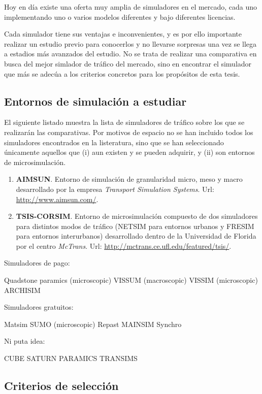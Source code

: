 Hoy en día existe una oferta muy amplia de simuladores en el mercado, cada uno implementando uno o varios modelos diferentes y bajo diferentes licencias.

Cada simulador tiene sus ventajas e inconvenientes, y es por ello importante realizar un estudio previo para conocerlos y no llevarse sorpresas una vez se llega a estadios más avanzados del estudio. No se trata de realizar una comparativa en busca del mejor simlador de tráfico del mercado, sino en encontrar el simulador que más se adecúa a los criterios concretos para los propósitos de esta tesis.

\subsection{Entornos de simulación a estudiar}

El siguiente listado muestra la lista de simuladores de tráfico sobre los que se realizarán las comparativas. Por motivos de espacio no se han incluido todos los simuladores encontrados en la listeratura, sino que se han seleccionado únicamente aquellos que (i) aun existen y se pueden adquirir, y (ii) son entornos de microsimulación.

\begin{enumerate}
	\item \textbf{AIMSUN}. Entorno de simulación de granularidad micro, meso y macro desarrollado por la empresa \textit{Transport Simulation Systems}. Url: \url{http://www.aimsun.com/}.
	\item \textbf{TSIS-CORSIM}. Entorno de microsimulación compuesto de dos simuladores para distintos modos de tráfico (NETSIM para entornos urbanos y FRESIM para entornos interurbanos) desarrollado dentro de la Universidad de Florida por el centro \textit{McTrans}. Url: \url{http://mctrans.ce.ufl.edu/featured/tsis/}.
\end{enumerate}

Simuladores de pago:

Quadstone paramics (microscopic)
VISSUM (macroscopic)
VISSIM (microscopic)
ARCHISIM

Simuladores gratuitos:

Matsim
SUMO (microscopic)
Repast
MAINSIM
Synchro

Ni puta idea:

CUBE
SATURN
PARAMICS
TRANSIMS


\subsection{Criterios de selección}

